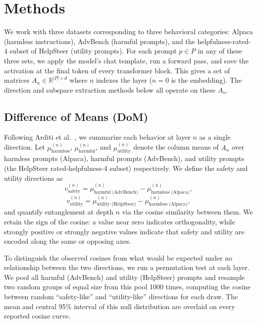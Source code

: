 \section{Methods}

We work with three datasets corresponding to three behavioral
categories: Alpaca \cite{alpaca} (harmless instructions),
AdvBench \cite{zou2023gcg} (harmful prompts), and the
helpfulness-rated-4 subset of HelpSteer
\cite{wang-etal-2024-helpsteer} (utility prompts). For each
prompt $p \in P$ in any of these three sets, we apply the model's
chat template, run a forward pass, and save the activation at the
final token of every transformer block. This gives a set of
matrices $A_n \in \mathbb{R}^{|P| \times d}$ where $n$ indexes the
layer ($n=0$ is the embedding). The direction and subspace
extraction methods below all operate on these $A_n$.


\subsection{Difference of Means (DoM)}
Following Arditi et al.~\cite{arditi2024refusal}, we summarize each
behavior at layer $n$ as a single direction. Let
$\mu^{(n)}_{\text{harmless}}$, $\mu^{(n)}_{\text{harmful}}$, and
$\mu^{(n)}_{\text{utility}}$ denote the column means of $A_n$ over
harmless prompts (Alpaca), harmful prompts (AdvBench), and utility
prompts (the HelpSteer rated-helpfulness-4 subset) respectively.
We define the safety and utility directions as
\[
v^{(n)}_{\text{safety}} = \mu^{(n)}_{\text{harmful (AdvBench)}}
                          - \mu^{(n)}_{\text{harmless (Alpaca)}},
\]
\[
v^{(n)}_{\text{utility}} = \mu^{(n)}_{\text{utility (HelpSteer)}}
                          - \mu^{(n)}_{\text{harmless (Alpaca)}},
\]
and quantify entanglement at depth $n$ via the cosine similarity
between them. We retain the sign of the cosine: a value near zero
indicates orthogonality, while strongly positive or strongly
negative values indicate that safety and utility are encoded along
the same or opposing axes.

To distinguish the observed cosines from what would be expected
under no relationship between the two directions, we run a
permutation test at each layer. We pool all harmful (AdvBench) and
utility (HelpSteer) prompts and resample two random groups of
equal size from this pool 1000 times, computing the cosine between
random ``safety-like'' and ``utility-like'' directions for each
draw. The mean and central 95\% interval of this null distribution
are overlaid on every reported cosine curve.


